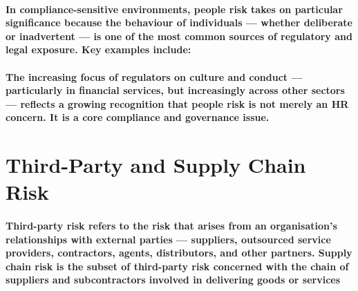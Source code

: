 \paragraph{In compliance-sensitive environments, people risk takes on particular significance because the behaviour of individuals — whether deliberate or inadvertent — is one of the most common sources of regulatory and legal exposure. Key examples include:}
\begin{itemize}
\end{itemize}
\paragraph{The increasing focus of regulators on \textbf{culture and conduct} — particularly in financial services, but increasingly across other sectors — reflects a growing recognition that people risk is not merely an HR concern. It is a core compliance and governance issue.}

\section{Third-Party and Supply Chain Risk}
\paragraph{\textbf{Third-party risk} refers to the risk that arises from an organisation's relationships with external parties — suppliers, outsourced service providers, contractors, agents, distributors, and other partners. \textbf{Supply chain risk} is the subset of third-party risk concerned with the chain of suppliers and subcontractors involved in delivering goods or services}

